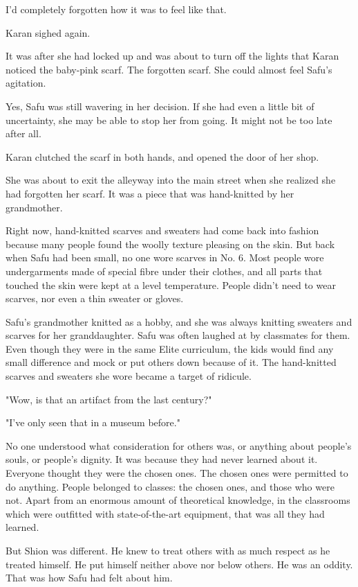 I'd completely forgotten how it was to feel like that.

Karan sighed again.

It was after she had locked up and was about to turn off the lights that
Karan noticed the baby-pink scarf. The forgotten scarf. She could almost
feel Safu's agitation.

Yes, Safu was still wavering in her decision. If she had even a little
bit of uncertainty, she may be able to stop her from going. It might not
be too late after all.

Karan clutched the scarf in both hands, and opened the door of her shop.

She was about to exit the alleyway into the main street when she
realized she had forgotten her scarf. It was a piece that was
hand-knitted by her grandmother.

Right now, hand-knitted scarves and sweaters had come back into fashion
because many people found the woolly texture pleasing on the skin. But
back when Safu had been small, no one wore scarves in No. 6. Most people
wore undergarments made of special fibre under their clothes, and all
parts that touched the skin were kept at a level temperature. People
didn't need to wear scarves, nor even a thin sweater or gloves.

Safu's grandmother knitted as a hobby, and she was always knitting
sweaters and scarves for her granddaughter. Safu was often laughed at by
classmates for them. Even though they were in the same Elite curriculum,
the kids would find any small difference and mock or put others down
because of it. The hand-knitted scarves and sweaters she wore became a
target of ridicule.

"Wow, is that an artifact from the last century?"

"I've only seen that in a museum before."

No one understood what consideration for others was, or anything about
people's souls, or people's dignity. It was because they had never
learned about it. Everyone thought they were the chosen ones. The chosen
ones were permitted to do anything. People belonged to classes: the
chosen ones, and those who were not. Apart from an enormous amount of
theoretical knowledge, in the classrooms which were outfitted with
state-of-the-art equipment, that was all they had learned.

But Shion was different. He knew to treat others with as much respect as
he treated himself. He put himself neither above nor below others. He
was an oddity. That was how Safu had felt about him.

